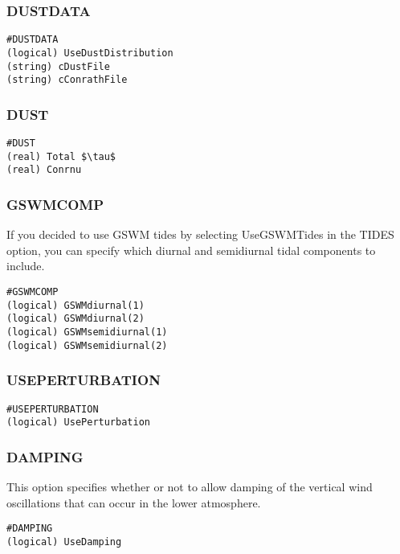\subsubsection{DUSTDATA}
\label{dustdata.sec}

\begin{verbatim}
#DUSTDATA
(logical) UseDustDistribution      
(string) cDustFile      
(string) cConrathFile  
\end{verbatim}

\subsubsection{DUST}
\label{dust.sec}

\begin{verbatim}
#DUST
(real) Total $\tau$      
(real) Conrnu
\end{verbatim}

\subsubsection{GSWMCOMP}
\label{gswmcomp.sec}

If you decided to use GSWM tides by selecting UseGSWMTides in the TIDES option, you can specify which diurnal and semidiurnal tidal components to include.

\begin{verbatim}
#GSWMCOMP
(logical) GSWMdiurnal(1)        
(logical) GSWMdiurnal(2)       
(logical) GSWMsemidiurnal(1)    
(logical) GSWMsemidiurnal(2)    
\end{verbatim}

\subsubsection{USEPERTURBATION}
\label{useperturbation.sec}

\begin{verbatim}
#USEPERTURBATION
(logical) UsePerturbation
\end{verbatim}

\subsubsection{DAMPING}
\label{damping.sec}

This option specifies whether or not to allow damping of the vertical wind oscillations that can occur in the lower atmosphere.

\begin{verbatim}
#DAMPING
(logical) UseDamping        
\end{verbatim}

